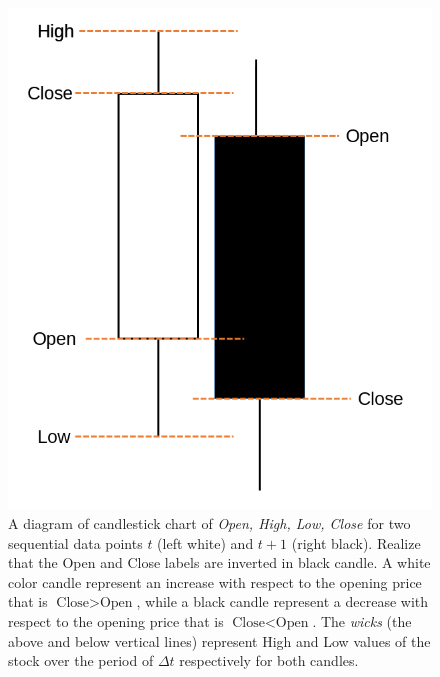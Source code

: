 \documentclass[conference]{IEEEtran}
\begin{document}
\begin{figure}\label{fig:OHLCVfig}
    \centering
    \includegraphics[scale=0.4]{Figs/Figures/OHLCV-Single.png}
    \caption{A diagram of candlestick chart of \textit{Open, High, Low, Close} for two sequential data points \(t\) (left white) and \(t+1\) (right black). Realize that the Open and Close labels are inverted in black candle. A white color candle represent an increase with respect to the opening price that is  \(\text{Close} > \text{Open} \), while a black candle represent a decrease with respect to the opening price that is \(\text{Close} < \text{Open} \). The \textit{wicks} (the above and below vertical lines) represent High and Low values of the stock over the period of \(\Delta t\) respectively for both candles.} 
\end{figure}
\end{document}
